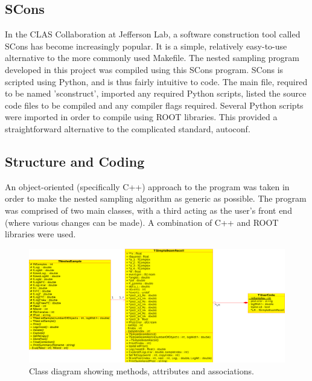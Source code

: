 \documentclass[a4paper,12pt]{article}
\begin{document}
\subsection{SCons}
In the CLAS Collaboration at Jefferson Lab, a software construction tool called SCons\cite{scons} has become increasingly popular.  It is a simple, relatively easy-to-use alternative to the more commonly used Makefile.  The nested sampling program developed in this project was compiled using this SCons program.  SCons is scripted using Python, and is thus fairly intuitive to code.  The main file, required to be named 'sconstruct', imported any required Python scripts, listed the source code files to be compiled and any compiler flags required. Several Python scripts were imported in order to compile using ROOT libraries.  This provided a straightforward alternative to the complicated standard, autoconf.


 
\subsection{Structure and Coding}
An object-oriented (specifically C++) approach to the program was taken in order to make the nested sampling algorithm as generic as possible.  The program was comprised of two main classes, with a third acting as the user's front end (where various changes can be made). A combination of C++ and ROOT libraries were used.  
\newline

\begin{figure}[!h]
 \begin{center}
  \includegraphics[scale=0.5]{class_diagram.eps}
  \caption{Class diagram showing methods, attributes and associations.}
 \end{center}
\end{figure}
\end{document}
